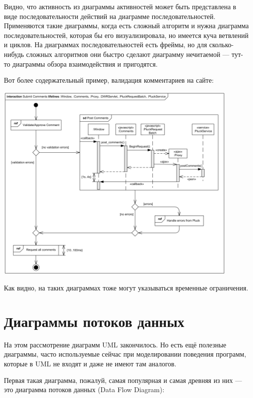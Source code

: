 \documentclass{../mcstext}
\begin{document}
Видно, что активность из диаграммы активностей может быть представлена в виде последовательности действий на диаграмме последовательностей. Применяются такие диаграммы, когда есть сложный алгоритм и нужна диаграмма последовательностей, которая бы его визуализировала, но имеется куча ветвлений и циклов. На диаграммах последовательностей есть фреймы, но для сколько-нибудь сложных алгоритмов они быстро сделают диаграмму нечитаемой --- тут-то диаграммы обзора взаимодействия и пригодятся. 

Вот более содержательный пример, валидация комментариев на сайте:

\begin{center}
    \includegraphics[width=0.9\textwidth]{interactionOverviewExample.png}
\end{center}

Как видно, на таких диаграммах тоже могут указываться временные ограничения.

\section{Диаграммы потоков данных}

На этом рассмотрение диаграмм UML закончилось. Но есть ещё полезные диаграммы, часто используемые сейчас при моделировании поведения программ, которые в UML не входят и даже не имеют там аналогов. 

Первая такая диаграмма, пожалуй, самая популярная и самая древняя из них --- это диаграмма потоков данных (Data Flow Diagram):
\end{document}
